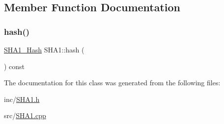 \subsection{Member Function Documentation}
\mbox{\label{class_s_h_a1_a75d7ba7c491c477ec43a842668cb7f0b}} 
\subsubsection{\texorpdfstring{hash()}{hash()}}
{\footnotesize\ttfamily \mbox{\hyperlink{struct_s_h_a1___hash}{S\+H\+A1\+\_\+\+Hash}} S\+H\+A1\+::hash (\begin{DoxyParamCaption}{ }\end{DoxyParamCaption}) const}



The documentation for this class was generated from the following files\+:\begin{DoxyCompactItemize}
\item 
inc/\mbox{\hyperlink{_s_h_a1_8h}{S\+H\+A1.\+h}}\item 
src/\mbox{\hyperlink{_s_h_a1_8cpp}{S\+H\+A1.\+cpp}}\end{DoxyCompactItemize}
